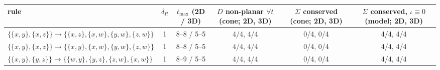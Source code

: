 \begin{tabular}{lccccc}
\toprule
rule & $\delta_R$ & $t_{\max}$ (2D / 3D) & $D$ non-planar $\forall t$ (cone; 2D, 3D) & $\Sigma$ conserved (cone; 2D, 3D) & $\Sigma$ conserved, $\iota\equiv0$ (model; 2D, 3D)\\
\midrule
$\{\{x,y\},\{x,z\}\}\to\{\{x,z\},\{x,w\},\{y,w\},\{z,w\}\}$ & 1 & 8--8 / 5--5 & 4/4, 4/4 & 0/4, 0/4 & 4/4, 4/4\\
$\{\{x,y\},\{x,z\}\}\to\{\{x,y\},\{x,w\},\{y,w\},\{z,w\}\}$ & 1 & 8--8 / 5--5 & 4/4, 4/4 & 0/4, 0/4 & 4/4, 4/4\\
$\{\{x,y\},\{y,z\}\}\to\{\{w,y\},\{y,z\},\{z,w\},\{x,w\}\}$ & 1 & 8--9 / 5--5 & 4/4, 4/4 & 0/4, 0/4 & 4/4, 4/4\\
\bottomrule
\end{tabular}
